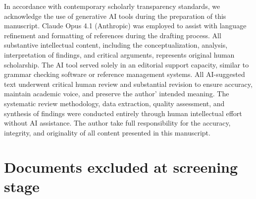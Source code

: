 \documentclass[
hf,
]{ceurart}
\begin{document}
\begin{aideclaration}
In accordance with contemporary scholarly transparency standards, we acknowledge the use of generative AI tools during the preparation of this manuscript. Claude Opus 4.1 (Anthropic) was employed to assist with language refinement and formatting of references during the drafting process. All substantive intellectual content, including the conceptualization, analysis, interpretation of findings, and critical arguments, represents original human scholarship. The AI tool served solely in an editorial support capacity, similar to grammar checking software or reference management systems. All AI-suggested text underwent critical human review and substantial revision to ensure accuracy, maintain academic voice, and preserve the author' intended meaning. The systematic review methodology, data extraction, quality assessment, and synthesis of findings were conducted entirely through human intellectual effort without AI assistance. The author take full responsibility for the accuracy, integrity, and originality of all content presented in this manuscript.
\end{aideclaration}





\appendix

\section{Documents excluded at screening stage} \label{sec:appendix-a}
\end{document}
